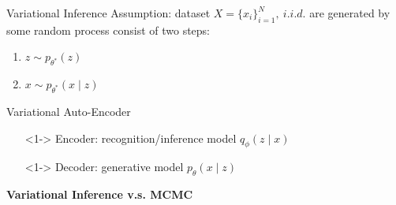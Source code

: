 \documentclass{beamer}
\begin{document}
\begin{frame}{Variational Inference}
Assumption: dataset $X = \{x_i\}^N_{i=1},~i.i.d.$ %
are generated by some random process consist of two steps:
\begin{enumerate}
    \item<1-> $z\sim p_{\theta^\ast}(z)$
    \item<1-> $x\sim p_{\theta^\ast}(x\mid z)$
\end{enumerate}

\begin{center}
Variational Auto-Encoder
\end{center}

\begin{enumerate}
    \item[]<1-> Encoder: recognition/inference model $q_{\phi}(z\mid x)$
    \item[]<1-> Decoder: generative model $p_{\theta}(x\mid z)$
\end{enumerate}
\end{frame}
{%
\begin{frame}
\begin{center}
{\bf\LARGE Variational Inference v.s. MCMC}
\end{center}
\end{frame}
}%
\end{document}
